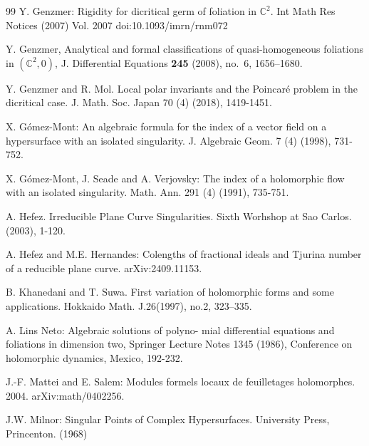 \documentclass[11pt]{amsart}
\newcommand{\C}{\mathbb{C}}
\begin{document}
\begin{thebibliography}{99}
 Y. Genzmer: Rigidity for dicritical germ of foliation in $\C^2$. Int Math Res Notices (2007) Vol. 2007 doi:10.1093/imrn/rnm072


Y. Genzmer, Analytical and formal classifications of quasi-homogeneous foliations in $(\mathbb{ C}^2,0)$, J. Differential Equations {\bf 245} (2008), no.~6, 1656--1680.



Y. Genzmer and R. Mol. Local polar invariants and the Poincar\'e problem in the dicritical case. J. Math. Soc. Japan 70 (4) (2018), 1419-1451. 

X. G\'omez-Mont: An algebraic formula for the index of a vector field on a hypersurface with an isolated singularity. J. Algebraic Geom. 7 (4) (1998), 731-752.

X. G\'omez-Mont, J. Seade and A. Verjovsky: The index of a holomorphic flow with an isolated singularity. Math. Ann. 291 (4) (1991), 735-751.

 A. Hefez. Irreducible Plane Curve Singularities. Sixth Worhshop at Sao Carlos. (2003), 1-120.

 A. Hefez and M.E. Hernandes: Colengths of fractional ideals and Tjurina number of a reducible plane curve. arXiv:2409.11153.



 B. Khanedani and T. Suwa. First variation of holomorphic forms and some applications. Hokkaido Math. J.26(1997), no.2, 323–335.

 A. Lins Neto: Algebraic solutions of polyno- mial differential equations and foliations in dimension two, Springer Lecture Notes 1345 (1986), Conference on holomorphic dynamics, Mexico, 192-232.

 J.-F. Mattei and E. Salem: Modules formels locaux de feuilletages holomorphes. 2004. arXiv:math/0402256.

 J.W. Milnor: Singular Points of Complex Hypersurfaces. University Press, Princenton. (1968) 


\end{thebibliography}
\end{document}
